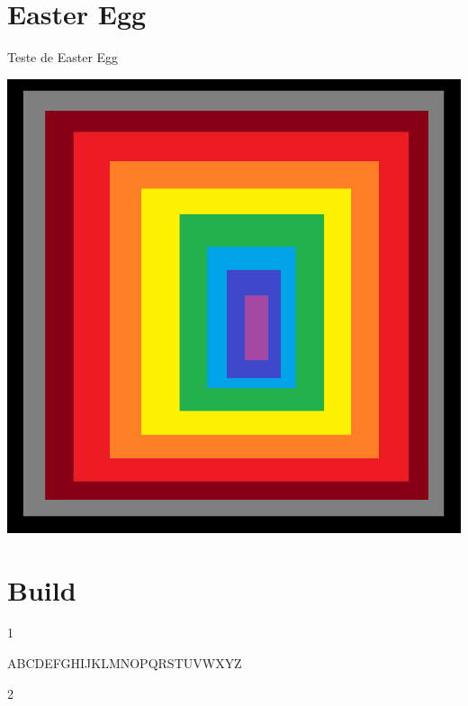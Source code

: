 \chapter{Easter Egg}

\begin{MyCenteredFigure}
  \caption{Teste de Easter Egg}
  \includegraphics[scale=0.5]{files/img/unused/teste}

\end{MyCenteredFigure}

\chapter{Build}

1

ABCDEFGHIJKLMNOPQRSTUVWXYZ

2
